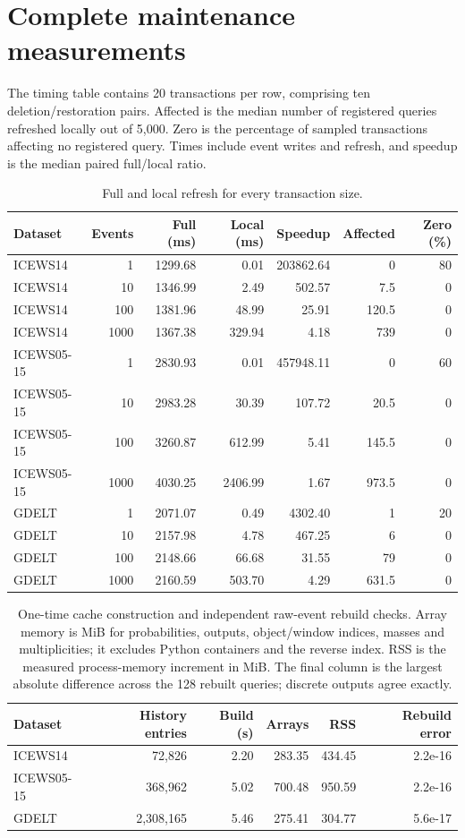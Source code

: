 \clearpage\section{Complete maintenance measurements}
The timing table contains 20 transactions per row, comprising ten deletion/restoration pairs. Affected is the median number of registered queries refreshed locally out of 5,000. Zero is the percentage of sampled transactions affecting no registered query. Times include event writes and refresh, and speedup is the median paired full/local ratio.
\small\begin{longtable}{lrrrrrr}\caption{Full and local refresh for every transaction size.}\\\toprule Dataset & Events & Full (ms) & Local (ms) & Speedup & Affected & Zero (\%)\\\midrule\endhead
ICEWS14 & 1 & 1299.68 & 0.01 & 203862.64 & 0 & 80\\
ICEWS14 & 10 & 1346.99 & 2.49 & 502.57 & 7.5 & 0\\
ICEWS14 & 100 & 1381.96 & 48.99 & 25.91 & 120.5 & 0\\
ICEWS14 & 1000 & 1367.38 & 329.94 & 4.18 & 739 & 0\\
ICEWS05-15 & 1 & 2830.93 & 0.01 & 457948.11 & 0 & 60\\
ICEWS05-15 & 10 & 2983.28 & 30.39 & 107.72 & 20.5 & 0\\
ICEWS05-15 & 100 & 3260.87 & 612.99 & 5.41 & 145.5 & 0\\
ICEWS05-15 & 1000 & 4030.25 & 2406.99 & 1.67 & 973.5 & 0\\
GDELT & 1 & 2071.07 & 0.49 & 4302.40 & 1 & 20\\
GDELT & 10 & 2157.98 & 4.78 & 467.25 & 6 & 0\\
GDELT & 100 & 2148.66 & 66.68 & 31.55 & 79 & 0\\
GDELT & 1000 & 2160.59 & 503.70 & 4.29 & 631.5 & 0\\
\bottomrule\end{longtable}\normalsize
\begin{table}[H]\centering\small\caption{One-time cache construction and independent raw-event rebuild checks. Array memory is MiB for probabilities, outputs, object/window indices, masses and multiplicities; it excludes Python containers and the reverse index. RSS is the measured process-memory increment in MiB. The final column is the largest absolute difference across the 128 rebuilt queries; discrete outputs agree exactly.}\begin{tabular}{lrrrrr}\toprule Dataset & History entries & Build (s) & Arrays & RSS & Rebuild error\\\midrule
ICEWS14 & 72,826 & 2.20 & 283.35 & 434.45 & 2.2e-16\\
ICEWS05-15 & 368,962 & 5.02 & 700.48 & 950.59 & 2.2e-16\\
GDELT & 2,308,165 & 5.46 & 275.41 & 304.77 & 5.6e-17\\
\bottomrule\end{tabular}\end{table}
